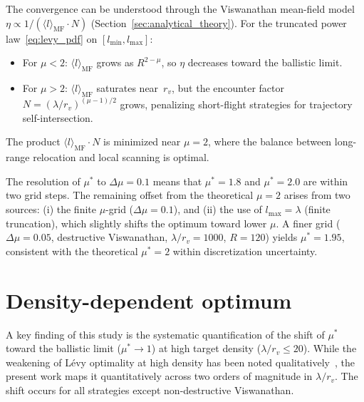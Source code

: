 The convergence can be understood through the Viswanathan
mean-field model $\eta \propto 1/(\langle l \rangle_{\mathrm{MF}}
\cdot N)$ (Section~\ref{sec:analytical_theory}).  For the
truncated power law~\eqref{eq:levy_pdf} on
$[l_{\min}, l_{\max}]$:
\begin{itemize}
  \item For $\mu < 2$: $\langle l \rangle_{\mathrm{MF}}$ grows
        as $R^{2-\mu}$, so $\eta$ decreases toward the ballistic
        limit.
  \item For $\mu > 2$: $\langle l \rangle_{\mathrm{MF}}$
        saturates near~$r_v$, but the encounter
        factor $N = (\lambda/r_v)^{(\mu-1)/2}$ grows,
        penalizing short-flight strategies for trajectory
        self-intersection.
\end{itemize}
The product $\langle l \rangle_{\mathrm{MF}} \cdot N$ is
minimized near $\mu = 2$, where the balance between
long-range relocation and local scanning is optimal.

The resolution of $\mu^*$ to $\Delta\mu = 0.1$ means that
$\mu^* = 1.8$ and $\mu^* = 2.0$ are within two grid steps.
The remaining offset from the theoretical $\mu = 2$ arises from
two sources: (i) the finite $\mu$-grid ($\Delta\mu = 0.1$),
and (ii) the use of $l_{\max} = \lambda$ (finite truncation),
which slightly shifts the optimum toward lower $\mu$.
A finer grid ($\Delta\mu = 0.05$, destructive Viswanathan,
$\lambda/r_v = 1000$, $R = 120$) yields $\mu^* = 1.95$,
consistent with the theoretical $\mu^* = 2$ within
discretization uncertainty.

\section{Density-dependent optimum}

A key finding of this study is the systematic quantification
of the shift of $\mu^*$ toward the ballistic limit
($\mu^* \to 1$) at high target density ($\lambda/r_v \leq 20$).
While the weakening of L\'evy optimality at high density has been
noted qualitatively~\cite{bartumeus2005animal}, the present work
maps it quantitatively across two orders of magnitude in
$\lambda/r_v$.  The shift occurs for all strategies except
non-destructive Viswanathan.

